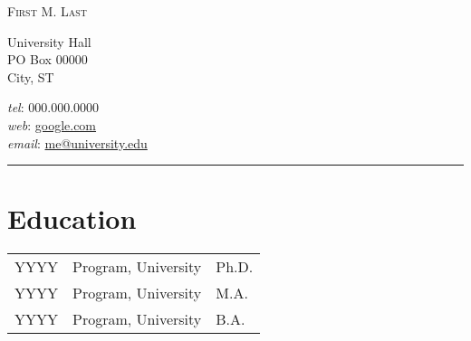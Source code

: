 \documentclass[11pt]{article}
\makeatletter
\newcommand{\myname}{First M. Last}              %
\newcommand{\websiteurl}{https://www.google.com} %
\newcommand{\websitename}{google.com}            %
\newcommand{\phone}{000.000.0000}                %
\newcommand{\email}{me@university.edu}           %
\newcommand{\address}{                           %
  University Hall \\
  PO Box 00000 \\            
  City, ST
}
\newcommand{\RR}{\raggedright\arraybackslash} %
\newcommand{\RL}{\raggedleft\arraybackslash}  %
\makeatother
\begin{document}
\thispagestyle{first}


\hspace*{-\parindent}%
\begin{center}
  \vspace{-2em}
  {\LARGE\scshape \myname} \\
\end{center}
\begin{minipage}[t]{.6\linewidth}
\address
\end{minipage}
\hspace*{-\parindent}%
\begin{minipage}[t]{.43\linewidth}
\begin{flushright}
  \textit{tel}: \phone \\
  \textit{web}: \href{\websiteurl}{\websitename} \\
  \textit{email}: \href{mailto:\email}{\email}
\end{flushright}
\end{minipage}
\begin{center}
  \vspace{-.5em}
  \rule{\textwidth}{1pt}  
\end{center}





\section*{Education}
\begin{tabularx}{\linewidth}{>{\RR}p{1in}>{\RR}X>{\RL}p{1in}}
  YYYY&Program, University&Ph.D. \\ %
  YYYY&Program, University&M.A. \\
  YYYY&Program, University&B.A. \\
\end{tabularx}
\end{document}
